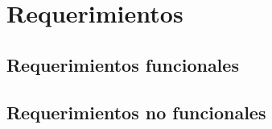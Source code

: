 \section{Requerimientos}

\subsection{Requerimientos funcionales}

\subsection{Requerimientos no funcionales}